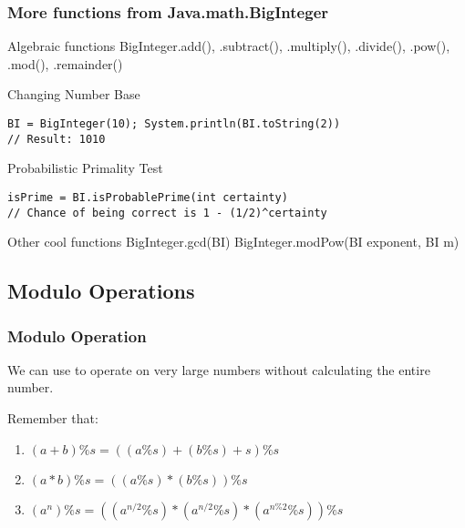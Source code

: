 \documentclass{beamer}
\begin{document}
\begin{frame}[fragile]
  \frametitle{More functions from Java.math.BigInteger}
{\smaller

  \begin{block}{Algebraic functions}
    BigInteger.add(), .subtract(), .multiply(), .divide(),
    .pow(), .mod(), .remainder()
  \end{block}

  \begin{block}{Changing Number Base}
\begin{verbatim}
BI = BigInteger(10); System.println(BI.toString(2))
// Result: 1010
\end{verbatim}
  \end{block}

  \begin{block}{Probabilistic Primality Test}
\begin{verbatim}
isPrime = BI.isProbablePrime(int certainty)
// Chance of being correct is 1 - (1/2)^certainty
\end{verbatim}
  \end{block}


\begin{block}{Other cool functions}
  BigInteger.gcd(BI)
  BigInteger.modPow(BI exponent, BI m)
\end{block}}
\end{frame}

\subsection{Modulo Operations}
\begin{frame}
  \frametitle{Modulo Operation}

  {\smaller
  We can use  to operate on very large
  numbers without calculating the entire number.

  \bigskip

  Remember that:
  \begin{enumerate}
  \item $(a+b)\%s = ((a\%s)+(b\%s)+s)\%s$
  \item $(a*b)\%s = ((a\%s)*(b\%s))\%s$
  \item $(a^n)\%s = ((a^{n/2}\%s)*(a^{n/2}\%s)*(a^{n\%2}\%s))\%s$
  \end{enumerate}

  }
\end{frame}
\end{document}
